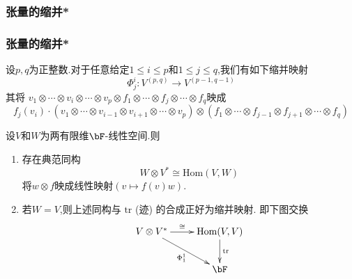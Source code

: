 \subsubsection{张量的缩并*}
\begin{frame}\frametitle{张量的缩并*}

设$p,q$为正整数.对于任意给定$1\leq i\leq p$和$1\leq j\leq q$,我们有如下缩并映射
\[\Phi^i_j\colon V^{(p,q)} \longrightarrow V^{(p-1,q-1)}\]
其将 $v_1\otimes \cdots \otimes v_i \otimes \cdots \otimes v_p \otimes f_1\otimes \cdots \otimes f_j \otimes \cdots \otimes f_q$映成
\[ f_j(v_i) \cdot (v_1\otimes \cdots \otimes v_{i-1} \otimes v_{i+1} \otimes \cdots \otimes v_p) \otimes (f_1\otimes \cdots \otimes f_{j-1}\otimes f_{j+1}\otimes \cdots \otimes f_q)\]

\begin{proposition}
设$V$和$W$为两有限维$\bF$-线性空间.\pp 则
\begin{enumerate}
\item 存在典范同构
\[W\otimes V^*\cong\mathrm{Hom}(V,W)\]
将$w\otimes f$映成线性映射$(v \mapsto f(v)w)$.
\item 若$W=V$,则上述同构与 $\mathrm{tr}$ (迹) 的合成正好为缩并映射. 即下图交换
\begin{equation*}
\xymatrix{
V\otimes V^* \ar[dr]_{\Phi_1^1} \ar[r]^-{\cong}&  \mathrm{Hom}(V,V) \ar[d]^{\mathrm{tr}}\\
& \bF\\}
\end{equation*}
\end{enumerate}
\end{proposition}
\end{frame}


























